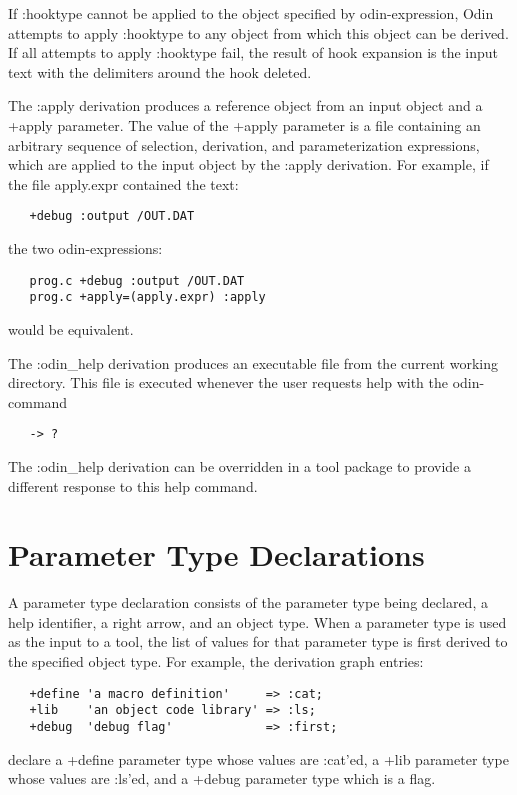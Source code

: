 If {\ex :hooktype} cannot be applied to the object specified by 
{\ex odin-expression},
Odin attempts to apply {\ex :hooktype} to any object
from which this object can be derived.
If all attempts to apply {\ex :hooktype} fail, the result of hook
expansion is the input text with the delimiters around the hook deleted.

The {\ex :apply} derivation produces a reference object
from an input object and a {\ex +apply} parameter.
The value of the {\ex +apply} parameter is a file containing
an arbitrary sequence of selection, derivation, and parameterization
expressions, which are applied to the input object by the
{\ex :apply} derivation.  For example, if the file {\ex apply.expr}
contained the text:
\begin{verbatim}
   +debug :output /OUT.DAT
\end{verbatim}
the two odin-expressions:
\begin{verbatim}
   prog.c +debug :output /OUT.DAT
   prog.c +apply=(apply.expr) :apply
\end{verbatim}
would be equivalent.

The {\ex :odin\_help} derivation produces an executable file
from the current working directory.
This file is executed whenever the user requests help with the odin-command
\begin{verbatim}
   -> ?
\end{verbatim}
The {\ex :odin\_help} derivation can be overridden in a tool package
to provide a different response to this help command.


\section{Parameter Type Declarations}
\label{parametertype}

A parameter type declaration consists of
the parameter type being declared,
a help identifier, a right arrow, and an object type.
When a parameter type is used as the input to a tool,
the list of values for that parameter type
is first derived to the specified object type.
For example, the derivation graph entries:
\begin{verbatim}
   +define 'a macro definition'     => :cat;
   +lib    'an object code library' => :ls;
   +debug  'debug flag'             => :first;
\end{verbatim}
declare a {\ex +define} parameter type whose values are {\ex :cat}'ed,
a {\ex +lib} parameter type whose values are {\ex :ls}'ed,
and a {\ex +debug} parameter type which is a flag.


